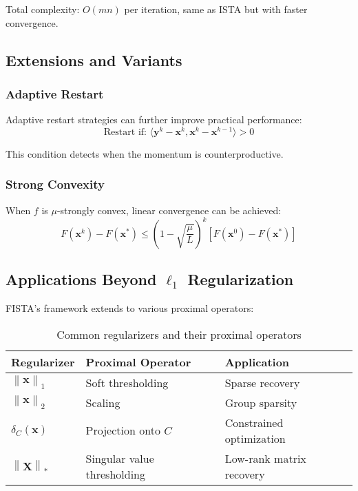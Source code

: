 \documentclass[12pt]{article}
\renewcommand{\vec}[1]{\mathbf{#1}}
\newcommand{\norm}[1]{\left\lVert#1\right\rVert}
\begin{document}
Total complexity: $O(mn)$ per iteration, same as ISTA but with faster convergence.

\subsection{Extensions and Variants}

\subsubsection{Adaptive Restart}

Adaptive restart strategies can further improve practical performance:
\begin{equation}
    \text{Restart if: } \langle \vec{y}^k - \vec{x}^k, \vec{x}^k - \vec{x}^{k-1} \rangle > 0
\end{equation}

This condition detects when the momentum is counterproductive.

\subsubsection{Strong Convexity}

When $f$ is $\mu$-strongly convex, linear convergence can be achieved:
\begin{equation}
    F(\vec{x}^k) - F(\vec{x}^*) \leq \left(1 - \sqrt{\frac{\mu}{L}}\right)^k [F(\vec{x}^0) - F(\vec{x}^*)]
\end{equation}

\subsection{Applications Beyond $\ell_1$ Regularization}

FISTA's framework extends to various proximal operators:
\begin{table}[h]
    \centering
    \begin{tabular}{@{}lll@{}}
        \toprule
        Regularizer         & Proximal Operator           & Application              \\
        \midrule
        $\norm{\vec{x}}_1$  & Soft thresholding           & Sparse recovery          \\
        $\norm{\vec{x}}_2$  & Scaling                     & Group sparsity           \\
        $\delta_C(\vec{x})$ & Projection onto $C$         & Constrained optimization \\
        $\norm{\vec{X}}_*$  & Singular value thresholding & Low-rank matrix recovery \\
        \bottomrule
    \end{tabular}
    \caption{Common regularizers and their proximal operators}
\end{table}
\end{document}
